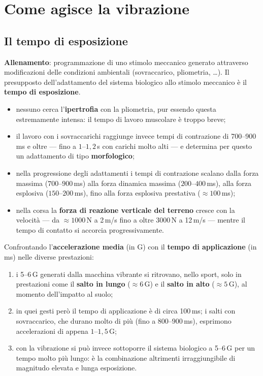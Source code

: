\section{Come agisce la vibrazione}

\subsection{Il tempo di esposizione}

\textbf{Allenamento}: programmazione di uno stimolo meccanico generato attraverso modificazioni
delle condizioni ambientali (sovraccarico, pliometria, \dots). Il presupposto dell'adattamento del
sistema biologico allo stimolo meccanico è il \textbf{tempo di esposizione}.

\begin{itemize}
  \item nessuno cerca l'\textbf{ipertrofia} con la pliometria, pur essendo questa estremamente
    intensa: il tempo di lavoro muscolare è troppo breve;
  \item il lavoro con i sovraccarichi raggiunge invece tempi di contrazione di 700--900\,ms e oltre
    --- fino a $1$--$1{,}2$\,s con carichi molto alti --- e determina per questo un adattamento di
    tipo \textbf{morfologico};
  \item nella progressione degli adattamenti i tempi di contrazione scalano dalla forza massima
    ($700$--$900$\,ms) alla forza dinamica massima ($200$--$400$\,ms), alla forza esplosiva
    ($150$--$200$\,ms), fino alla forza esplosiva prestativa ($\approx 100$\,ms);
  \item nella corsa la \textbf{forza di reazione verticale del terreno} cresce con la velocità ---
    da $\approx 1000$\,N a 2\,m/s fino a oltre $3000$\,N a 12\,m/s --- mentre il tempo di contatto
    si accorcia progressivamente.
\end{itemize}

Confrontando l'\textbf{accelerazione media} (in G) con il \textbf{tempo di applicazione} (in ms)
nelle diverse prestazioni:
\begin{enumerate}
  \item i 5--6\,G generati dalla macchina vibrante si ritrovano, nello sport, solo in prestazioni
    come il \textbf{salto in lungo} ($\approx 6$\,G) e il \textbf{salto in alto} ($\approx 5$\,G),
    al momento dell'impatto al suolo;
  \item in quei gesti però il tempo di applicazione è di circa 100\,ms; i salti con sovraccarico,
    che durano molto di più (fino a $800$--$900$\,ms), esprimono accelerazioni di appena
    $1$--$1{,}5$\,G;
  \item con la vibrazione si può invece sottoporre il sistema biologico a 5--6\,G per un tempo molto
    più lungo: è la combinazione altrimenti irraggiungibile di magnitudo elevata e lunga
    esposizione.
\end{enumerate}

